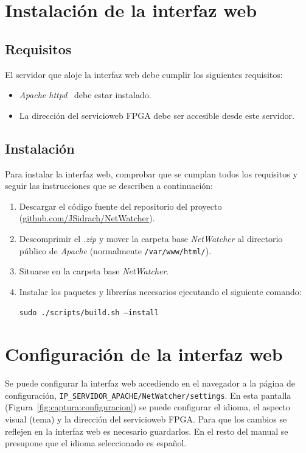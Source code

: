 \section{Instalación de la interfaz web\label{extra:manual:instalacionweb}}

\subsection*{Requisitos}
El servidor que aloje la interfaz web debe cumplir los siguientes requisitos:
\begin{itemize}
  \item \textit{Apache httpd}~\cite{httpd} debe estar instalado.
  \item La dirección del \gls{servicioweb} \gls{FPGA} debe ser accesible desde este servidor.
\end{itemize}

\subsection*{Instalación}
Para instalar la interfaz web, comprobar que se cumplan todos los requisitos y seguir las instrucciones que se describen a continuación:
\begin{enumerate}
  \item Descargar el código fuente del repositorio del proyecto (\href{https://github.com/JSidrach/NetWatcher/archive/master.zip}{\footnotesize{github.com/JSidrach/NetWatcher}}).
  \item Descomprimir el \textit{.zip} y mover la carpeta base \textit{NetWatcher} al directorio público de \textit{Apache} (normalmente \texttt{/var/www/html/}).
  \item Situarse en la carpeta base \textit{NetWatcher}.
  \item Instalar los paquetes y librerías necesarios ejecutando el siguiente comando:

  \texttt{sudo ./scripts/build.sh --install}
\end{enumerate}


\section{Configuración de la interfaz web\label{extra:manual:configweb}}

Se puede configurar la interfaz web accediendo en el navegador a la página de configuración, \texttt{IP\_SERVIDOR\_APACHE/NetWatcher/settings}.
En esta pantalla (Figura~\ref{fig:captura:configuracion}) se puede configurar el idioma, el aspecto visual (tema) y la dirección del \gls{servicioweb} \gls{FPGA}.
Para que los cambios se reflejen en la interfaz web es necesario guardarlos.
En el resto del manual se presupone que el idioma seleccionado es español.

